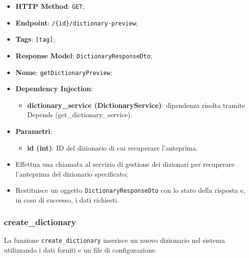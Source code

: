 \begin{itemize}
  \item \textbf{HTTP Method}: \texttt{GET};
  \item \textbf{Endpoint}: \texttt{/\{id\}/dictionary-preview};
  \item \textbf{Tags}: \texttt{[tag]};
  \item \textbf{Response Model}: \texttt{DictionaryResponseDto};
  \item \textbf{Nome}: \texttt{getDictionaryPreview};
  \item \textbf{Dependency Injection}:
  \begin{itemize}
    \item \textbf{dictionary\_service (DictionaryService)}: dipendenza risolta tramite Depends (get\_dictionary\_service).
  \end{itemize}
  \item \textbf{Parametri}:
  \begin{itemize}
    \item \textbf{id (int)}: ID del dizionario di cui recuperare l'anteprima.
  \end{itemize}
\end{itemize}

\begin{itemize}
  \item Effettua una chiamata al servizio di gestione dei dizionari per recuperare l'anteprima del dizionario specificato;
  \item Restituisce un oggetto \texttt{DictionaryResponseDto} con lo stato della risposta e, in caso di successo, i dati richiesti.
\end{itemize}

\subsubsection{create\_dictionary}

\par La funzione \texttt{create\_dictionary} inserisce un nuovo dizionario nel sistema utilizzando i dati forniti e un file di configurazione.

